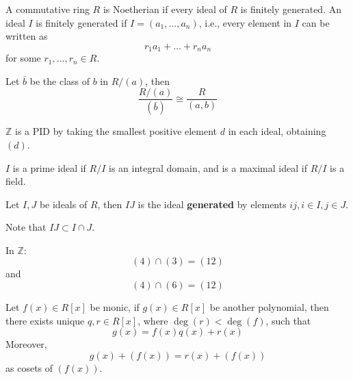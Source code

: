 \documentclass[openany]{book}
\newcommand{\Z}{\mathbb{Z}}
\begin{document}
\begin{defn}[Noetherian]
    A commutative ring $R$ is Noetherian if every ideal of $R$ is finitely generated. An ideal $I$ is finitely generated if $I=(a_1,\dots,a_n)$, i.e., every element in $I$ can be written as 
    \begin{equation*}
        r_1a_1+\dots+r_na_n
    \end{equation*}
    for some $r_1,\dots, r_n\in R$.
\end{defn}

\begin{prop}
    Let $\bar{b}$ be the class of $b$ in $R/(a)$, then 
    \begin{equation*}
        \frac{R/(a)}{(\bar{b})}\cong\frac{R}{(a,b)}
    \end{equation*}
\end{prop}
\begin{prop}
    $\Z$ is a PID by taking the smallest positive element $d$ in each ideal, obtaining $(d)$.
\end{prop}


\begin{defn}
    $I$ is a prime ideal if $R/I$ is an integral domain, and is a maximal ideal if $R/I$ is a field.
\end{defn}
\begin{defn}
    Let $I,J$ be ideals of $R$, then $IJ$ is the ideal \textbf{generated} by elements $ij, i\in I, j\in J$.

    Note that $IJ\subset I\cap J$. 
\end{defn}

\begin{example}
    In $\Z$:
    \begin{equation*}
        (4)\cap(3)=(12)
    \end{equation*}
    and 
    \begin{equation*}
        (4)\cap(6)=(12)
    \end{equation*}
\end{example}
\begin{defn}
    Let $f(x)\in R[x]$ be monic, if $g(x)\in R[x]$ be another polynomial, then there exists unique $q,r\in R[x]$, where $\deg(r)<\deg(f)$, such that 
    \begin{equation*}
        g(x)=f(x)q(x)+r(x)
    \end{equation*}
    Moreover, 
    \begin{equation*}
        g(x)+(f(x))=r(x)+(f(x))
    \end{equation*}
    as cosets of $(f(x))$.
\end{defn}
\end{document}
